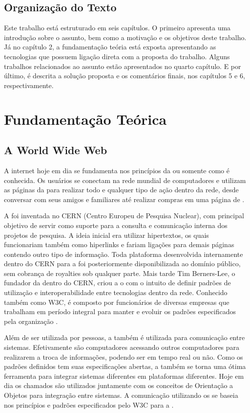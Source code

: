 \documentclass[espaco=simples,appendix=Name]{abnt}
\begin{document}
\section{Organização do Texto}
Este trabalho está estruturado em seis capítulos. O primeiro apresenta uma introdução sobre o assunto, bem como a motivação e os objetivos deste trabalho. Já no capítulo 2, a fundamentação teória está exposta apresentando as tecnologias que possuem ligação direta com a proposta do trabalho. Alguns trabalhos relacionados ao assunto estão apresentados no quarto capítulo. E por último, é descrita a solução proposta e os comentários ﬁnais, nos capítulos 5 e 6, respectivamente.

\chapter{Fundamentação Teórica}

\section{A World Wide Web}

A internet hoje em dia se fundamenta nos princípios da  ou somente  como é conhecida. Os usuários se conectam na rede mundial de computadores e utilizam as páginas da  para realizar todo e qualquer tipo de ação dentro da rede, desde conversar com seus amigos e familiares até realizar compras em uma página de .

A  foi inventada no CERN (Centro Europeu de Pesquisa Nuclear), com principal objetivo de servir como suporte para a consulta e comunicação interna dos projetos de pesquisa\cite{WebStory}. A ideia inicial era utilizar hipertextos, os quais funcionariam também como hiperlinks e fariam ligações para demais páginas contendo outro tipo de informação. Toda plataforma desenvolvida internamente dentro do CERN para a  foi posteriormente disponibilizada ao domínio público, sem cobrança de royalties sob qualquer parte. Mais tarde Tim Berners-Lee, o fundador da  dentro do CERN, criou a o  com o intuito de definir padrões de utilização e interoperabilidade entre tecnologias dentro da rede. Conhecido também como W3C, é composto por funcionários de diversas empresas que trabalham em período integral para manter e evoluir os padrões especificados pela organização \cite{W3Cfacts}.

Além de ser utilizada por pessoas, a  também é utilizada para comunicação entre sistemas. Efetivamente são computadores acessando outros computadores para realizarem a troca de informações, podendo ser em tempo real ou não. Como os padrões definidos tem suas especificações abertas, a  também se torna uma ótima ferramenta para integrar sistemas diferentes em plataformas diferentes. Hoje em dia os chamados  são utilizados juntamente com os conceitos de Orientação a Objetos para integração entre sistemas. A comunicação utilizando os  se baseia nos princípios e padrões especificados pelo W3C para a  \cite{WebServices}.
\end{document}
